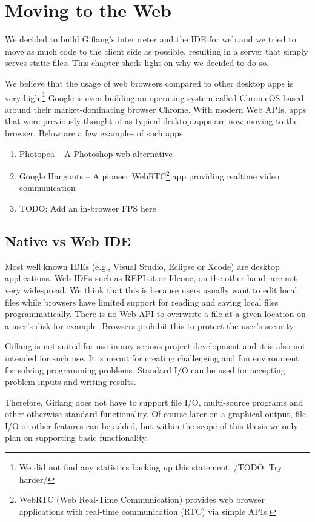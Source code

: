 \chapter{Moving to the Web}
\label{chap2}

We decided to build Giflang's interpreter and the IDE for web and we tried to move as much code to the client side as possible, resulting in a server that
simply serves static files. This chapter sheds light on why we decided to do so.

We believe that the usage of web browsers compared to other desktop apps is very high.\footnote{We did not
find any statistics backing up this statement. /TODO: Try harder/} Google is even building an operating system called ChromeOS based around their
market-dominating browser Chrome. With modern Web APIs, apps that were previously thought of as typical desktop apps are now moving to the browser. Below
are a few examples of such apps:
\begin{enumerate}
\item Photopea \cite{Photopea} -- A Photoshop web alternative
\item Google Hangouts \cite{Hangouts} -- A pioneer WebRTC\footnote{WebRTC (Web Real-Time Communication) provides web browser 
applications with real-time communication (RTC) via simple APIs.} app providing realtime video communication
\item TODO: Add an in-browser FPS here
\end{enumerate}

\section{Native vs Web IDE}
Most well known IDEs (e.g., Visual Studio, Eclipse or Xcode) are desktop applications. Web IDEs such as REPL.it or Ideone, on the other hand,
are not very widespread. We think that this is because users usually want to edit local files while browsers have limited support for reading
and saving local files programmatically. There is no Web API to overwrite a file at a given location on a user's disk for example.
Browsers prohibit this to protect the user's security.

Giflang is not suited for use in any serious project development and it is also not intended for such use. It is meant for creating
challenging and fun environment for solving programming problems. Standard I/O can be used for accepting problem inputs and writing results.

Therefore, Giflang does not have to support file I/O, multi-source programs and other otherwise-standard functionality. Of course later
on a graphical output, file I/O or other features can be added, but within the scope of this thesis we only plan on supporting
basic functionality.

